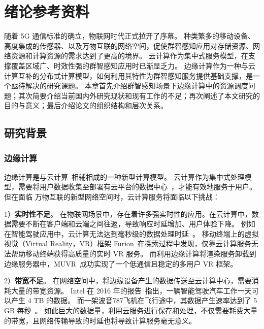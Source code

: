 \chapter{绪论参考资料}


随着 5G 通信标准的确立，物联网时代正式拉开了序幕。
种类繁多的移动设备、高度集成的传感器、以及万物互联的网络空间，促使群智感知应用对存储资源、网络资源和计算资源的需求达到了更高的境界。
云计算作为集中式服务模型，在支撑覆盖区域广、时效性强的群智感知应用时已渐显乏力。
边缘计算作为一种与云计算互补的分布式计算模型，如何利用其特性为群智感知服务提供基础支撑，是一个亟待解决的研究课题。
本章首先介绍群智感知场景下边缘计算中的资源调度问题；其次简要介绍当前国内外研究现状和现有工作的不足；再次阐述了本文研究的目的与意义；最后介绍论文的组织结构和层次关系。

\section{研究背景}

\subsection{边缘计算}
边缘计算是与云计算~\cite{DBLP:journals/cacm/ArmbrustFGJKKLPRSZ10}相辅相成的一种新型计算模型。
云计算作为集中式处理模型，需要将用户数据收集至部署有云平台的数据中心~\cite{DBLP:conf/icdcs/Montresor16}，才能有效地服务于用户。
但在面临 万物互联的新型网络空间时，云计算服务将面临以下挑战：

1）\textbf{实时性不足}。
在物联网场景中，存在着许多强实时性的应用。在云计算中，数据需要不断在客户端和云端之间往返，导致响应时延增加、用户体验下降。
例如在智能驾驶应用中，云计算无法达到毫秒级的数据处理时延~\cite{DBLP:conf/cvpr/GeigerLU12}。
移动终端上的虚拟视觉（Virtual Reality，VR）框架 Furion~\cite{DBLP:conf/mobicom/LaiHCSD17}在探索过程中发现，仅靠云计算服务无法帮助移动终端获得高质量的实时 VR 服务。
而利用边缘计算将渲染服务卸载到边缘服务器中，MUVR~\cite{DBLP:conf/edge/LiG18}成功实现了一个低通信且稳定的多用户 VR 框架。

2）\textbf{带宽不足}。
在网络空间中，将边缘设备产生的数据传送至云计算中心，需要消耗大量的带宽资源。
Intel 在 2016 年的报告~\cite{DBLP:journals/micro/KatoTINTH15}指出，一辆智能驾驶汽车工作一天可以产生 4 TB 的数据。
而一架波音787飞机在飞行途中，其数据产生速率达到了 5 GB 每秒~\cite{JCRD/shi17}。
如此巨大的数据量，利用云服务进行保存和处理，不仅需要耗费大量的带宽，且网络传输导致的时延也将导致计算服务毫无意义。

